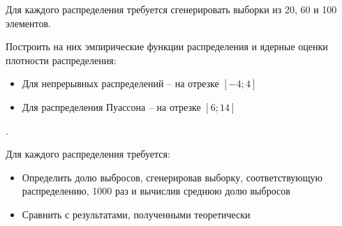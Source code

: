 \item 
Для каждого распределения требуется сгенерировать выборки из 20, 60 и 100 элементов.

Построить на них эмпирические функции распределения и ядерные оценки плотности распределения:
\begin{itemize}
	\item Для непрерывных распределений -- на отрезке $[-4; 4]$
	\item Для распределения Пуассона -- на отрезке $[6; 14]$
\end{itemize} .

Для каждого распределения требуется:
\begin{itemize}
	\item Определить долю выбросов, сгенерировав выборку, соответствующую распределению, 1000 раз и вычислив среднюю долю выбросов
	\item Сравнить с результатами, полученными теоретически
\end{itemize}
